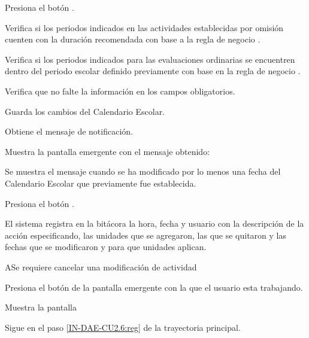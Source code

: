 \begin{UCtrayectoria}
\UCpaso[\UCactor]Presiona el botón .

\UCpaso Verifica si los periodos indicados en las actividades establecidas por omisión cuenten con la duración recomendada con base a la regla de negocio . 


\UCpaso Verifica si los periodos indicados para las evaluaciones ordinarias se encuentren dentro del periodo escolar definido previamente con base en la regla de negocio . 

\UCpaso  \label{IN-DAE-CU2.6:sel} Verifica que no falte la información en los  campos obligatorios. 

\UCpaso Guarda los cambios del Calendario Escolar.

\UCpaso Obtiene el mensaje  de notificación. 

\UCpaso  \label{IN-DAE-CU2.6:noti} Muestra la pantalla emergente  con el mensaje obtenido:

	\Titem Se muestra el mensaje  cuando se ha modificado por lo menos una fecha del Calendario Escolar que previamente fue establecida.  

 \UCpaso[\UCactor]Presiona el botón . 
 
\UCpaso El sistema registra en la bitácora la hora, fecha y usuario con la descripción de la acción especificando, las unidades que se agregaron, las que se quitaron y las fechas que se modificaron y para que unidades aplican.
\end{UCtrayectoria}




\begin{UCtrayectoriaA}{A}{Se requiere cancelar una modificación de actividad}
	
	\UCpaso [\UCactor] 	Presiona el botón  de la pantalla emergente con la que el usuario esta trabajando.
	
	\UCpaso Muestra la pantalla  
	
	\UCpaso Sigue en el paso \ref{IN-DAE-CU2.6:reg} de la trayectoria principal.
	
\end{UCtrayectoriaA}


